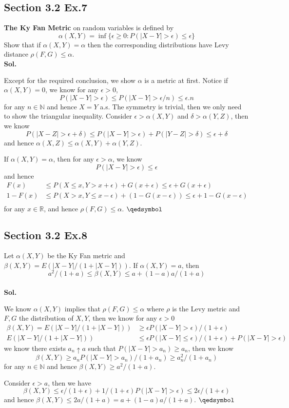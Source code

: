 \documentclass[lang=en,11pt,a4paper,citestyle =authoryear]{elegantpaper}
\newcommand{\prvd}{$\hfill \qedsymbol$}
\newcommand{\R}{\mathbb{R}}
\newcommand{\N}{\mathbb{N}}
\begin{document}
\subsection*{Section 3.2 Ex.7} 
\textbf{The Ky Fan Metric} on random variables is defined by
\[\alpha(X,Y) =\inf\{\epsilon \geq 0: P(|X-Y|>\epsilon)\leq \epsilon\}\]
Show that if $\alpha(X,Y)= \alpha$ then the corresponding distributions have Levy distance $\rho(F,G)\leq \alpha$.
\vspace{0.5em}\\
\textbf{Sol.} \par
Except for the required conclusion, we show $\alpha$ is a metric at first. Notice if $\alpha(X,Y) = 0$, we know for any $\epsilon > 0$,
\[ P (|X-Y|>\epsilon) \leq P(|X-Y|>\epsilon/n) \leq \epsilon.n\]
for any $n\in\N$ and hence $X=Y$ a.s. The symmetry is trivial, then we only need to show the triangular inequality. Consider $\epsilon>\alpha(X,Y)$ and $\delta>\alpha(Y,Z)$, then we know
\[P(|X-Z|>\epsilon+\delta) \leq P(|X-Y|>\epsilon)+P(|Y-Z|>\delta) \leq \epsilon + \delta\]
and hence $\alpha(X,Z)\leq \alpha(X,Y)+\alpha(Y,Z)$.\par
If $\alpha(X,Y)=\alpha$, then for any $\epsilon > \alpha$, we know
\[P(|X-Y|>\epsilon) \leq \epsilon\]
and hence
\[
\begin{aligned}
F(x) &\leq P(X\leq x, Y>x+\epsilon) + G(x+\epsilon) \leq \epsilon + G(x+\epsilon) \\
1- F(x) &\leq P(X>x, Y\leq x-\epsilon) + (1-G(x-\epsilon)) \leq \epsilon + 1 - G(x-\epsilon) \\ 
\end{aligned}
\]
for any $x\in\R$, and hence $\rho(F,G) \leq \alpha$.
\prvd
\vspace{0.5em}

\subsection*{Section 3.2 Ex.8} 
Let $\alpha(X,Y)$ be the Ky Fan metric and $\beta(X,Y)=E(|X-Y|/(1+|X-Y|))$. If $\alpha(X,Y)=a$, then
\[
a^2/(1+a)\leq \beta(X,Y)\leq a+(1-a)a/(1+a)
\]
\vspace{0.5em}\\
\textbf{Sol.} \par
We know $\alpha(X,Y)$ implies that $\rho(F,G)\leq \alpha$ where $\rho$ is the Levy metric and $F,G$ the distribution of $X,Y$, then we know for any $\epsilon>0$
\[
\begin{aligned}
\beta(X,Y) = E(|X-Y|/(1+|X-Y|)) &\geq \epsilon P(|X-Y|>\epsilon)/(1+\epsilon) \\
E(|X-Y|/(1+|X-Y|)) &\leq \epsilon P(|X-Y|\leq \epsilon)/(1+\epsilon) + P(|X-Y| > \epsilon)
\end{aligned}
\]
we know there exists $a_n\uparrow a$ such that $P(|X-Y|>a_n)\geq a_n$, then we know
\[\beta(X,Y)\geq a_nP(|X-Y|>a_n)/(1+a_n) \geq a_n^2/(1+a_n)\]
for any $n\in\N$ and hence $\beta(X,Y)\geq a^2/(1+a)$.\par
Consider $\epsilon > a$, then we have
\[
\beta(X,Y) \leq \epsilon/(1+\epsilon) + 1/(1+\epsilon)P(|X-Y|>\epsilon) \leq 2\epsilon/(1+\epsilon) 
\] 
and hence $\beta(X,Y) \leq 2a/(1+a) = a +(1-a)a/(1+a)$.
\prvd
\vspace{0.5em}
\end{document}
